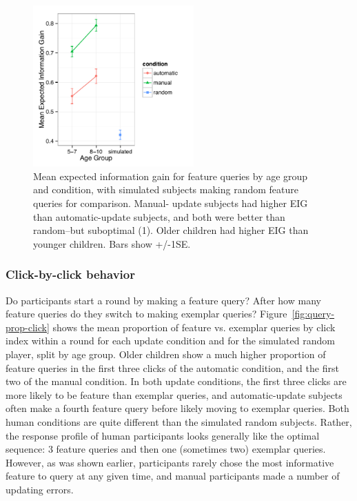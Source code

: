 \documentclass[man,floatsintext]{apa6}
\begin{document}
\begin{figure}[t]
  \centering
  \includegraphics[width=0.55\textwidth]{figures/EIG_by_ageGroup_n_condition}
  \caption{Mean expected information gain for feature queries by age group and condition, 
with simulated subjects making random feature queries for comparison. Manual-
update subjects had higher EIG than automatic-update subjects, and both were 
better than random--but suboptimal (1). Older children had higher EIG than younger children. Bars show +/-1SE.}
  \label{fig:EIG_by_age}
\end{figure} 


\subsubsection{Click-by-click behavior}

Do participants start a round by making a feature query? After how many feature 
queries do they switch to making exemplar queries? Figure~\ref{fig:query-prop-click} shows the mean proportion of feature vs. exemplar queries by click index within a round for each update condition and for the simulated random player, split by age group. Older children show a much higher proportion of feature queries in the first three clicks of the automatic condition, and the first two of the manual condition. In both update conditions, the first three clicks are more likely to be feature than exemplar queries, and automatic-update subjects often make a fourth feature query before likely moving to exemplar queries. Both human 
conditions are quite different than the simulated random subjects. Rather, the response profile of human participants looks generally like the optimal sequence: 3 feature queries and then one (sometimes two) exemplar queries. However, as was shown earlier, participants rarely chose the most informative feature to query at any given time, and manual participants made a number of updating errors. 
\end{document}
